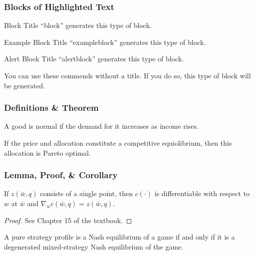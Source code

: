\documentclass[
	11pt, %
]{beamer}
\begin{document}
\begin{frame}
	\frametitle{Blocks of Highlighted Text}
	
	\begin{block}{Block Title}
		``block'' generates this type of block.
	\end{block}
	
	\begin{exampleblock}{Example Block Title}
		``exampleblock'' generates this type of block.
	\end{exampleblock}
	
	\begin{alertblock}{Alert Block Title}
		``alertblock'' generates this type of block.
	\end{alertblock}
	
	\begin{block}{} %
		You can use these commends without a title. If you do so,
		this type of block will be generated.
	\end{block}
\end{frame}

\begin{frame}
	\frametitle{Definitions \& Theorem}
	
	\begin{definition}
		A good is \alert{normal} if the demand for it increases as income rises.
	\end{definition}

	\bigskip %

	\begin{theorem}
		If the price and allocation constitute a competitive equiolibrium, then
		this allocation is Pareto optimal.
	\end{theorem}
\end{frame}

\begin{frame}
	\frametitle{Lemma, Proof, \& Corollary}
	
	\begin{lemma}
		If $z(\bar{w}, q)$ consists of a single point, then $c(\cdot)$ is differentiable
		with respect to $w$ at $\bar{w}$ and $\nabla_{w} c(\bar{w}, q) = z(\bar{w}, q)$.
	\end{lemma}

	\begin{proof}
		See Chapter 15 of the textbook.
	\end{proof}

	\bigskip %

	\begin{corollary}
		A pure strategy profile is a Nash equilibrium of a game if and only if it is
		a degenerated mixed-strategy Nash equilibrium of the game.
	\end{corollary}
\end{frame}
\end{document}
